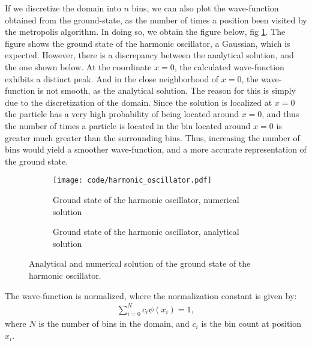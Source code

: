 \documentclass[a4paper]{article}
\newcommand{\newparagraph}{\vspace{.5cm}\noindent}
\begin{document}
\newparagraph
If we discretize the domain into $n$ bins, we can also plot the wave-function obtained from the ground-state, as the number of times a position been visited by the metropolis algorithm.
In doing so, we obtain the figure below, fig \ref*{fig: harmonic_oscillator}.
The figure shows the ground state of the harmonic oscillator, a Gaussian, which is expected.
However, there is a discrepancy between the analytical solution, and the one shown below. At the coordinate $x = 0$, the calculated wave-function exhibits a distinct peak.
And in the close neighborhood of $x = 0$, the wave-function is not smooth, as the analytical solution.
The reason for this is simply due to the discretization of the domain.
Since the solution is localized at $x = 0$ the particle has a very high probability of being located around $x = 0$, and thus the number of times a particle is located in the bin located around $x = 0$ is greater much greater than the surrounding bins.
Thus, increasing the number of bins would yield a smoother wave-function, and a more accurate representation of the ground state. 
\begin{figure}
    \centering
    \begin{subfigure}{0.45\textwidth}
        \texttt{[image: code/harmonic\_oscillator.pdf]}
        \caption{Ground state of the harmonic oscillator, numerical solution}
        \label{fig: harmonic_oscillator}
    \end{subfigure}
    \hfill
    \begin{subfigure}{0.45\textwidth}
       \caption{Ground state of the harmonic oscillator, analytical solution}
       \label{fig: harmonic_oscillator analytical}
    \end{subfigure}
    \caption{Analytical and numerical solution of the ground state of the harmonic oscillator.}
    \label{fig: harmonic_oscillator comparison}
\end{figure}\noindent
The wave-function is normalized, where the normalization constant is given by:
\begin{align*}
    \sum_{i = 0}^{N} c_i\psi(x_i) = 1,
\end{align*}where $N$ is the number of bins in the domain, and $c_i$ is the bin count at position $x_i$.
\newpage
\end{document}
